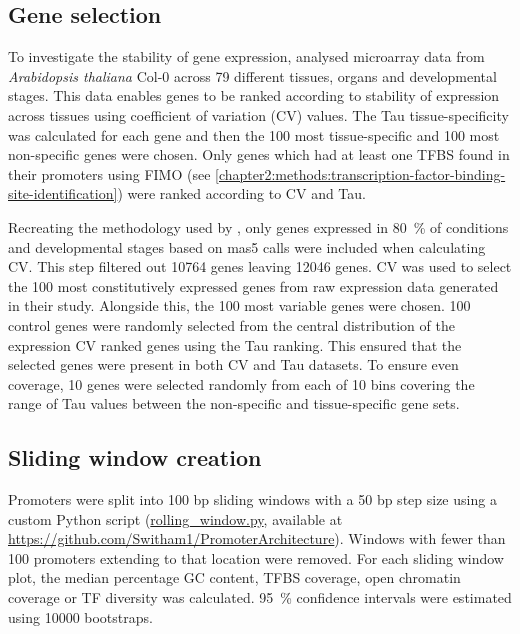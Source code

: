 \documentclass[../main.tex]{subfiles}
\begin{document}
\subsection{Gene selection}\label{chapter2:methods:gene-selection}

To investigate the stability of gene expression, \textcite*{czechowskiGenomeWideIdentificationTesting2005} analysed microarray data from \textit{Arabidopsis thaliana} Col-0 across 79 different tissues, organs and developmental stages.
This data enables genes to be ranked according to stability of expression across tissues using coefficient of variation (CV) values.
The Tau tissue\hyp{}specificity \autocite{yanaiGenomewideMidrangeTranscription2005} was calculated for each gene and then the 100 most tissue\hyp{}specific and 100 most non\hyp{}specific genes were chosen.
Only genes which had at least one TFBS found in their promoters using FIMO (see \autoref{chapter2:methods:transcription-factor-binding-site-identification}) were ranked according to CV and Tau.

Recreating the methodology used by \textcite*{czechowskiGenomeWideIdentificationTesting2005}, only genes expressed in \SI{80}{\percent} of conditions and developmental stages based on mas5 calls were included when calculating CV.
This step filtered out 10764 genes leaving 12046 genes.
CV was used to select the 100 most constitutively expressed genes from raw expression data generated in their study.
Alongside this, the 100 most variable genes were chosen.
100 control genes were randomly selected from the central distribution of the expression CV ranked genes using the Tau ranking.
This ensured that the selected genes were present in both CV and Tau datasets.
To ensure even coverage, 10 genes were selected randomly from each of 10 bins covering the range of Tau values between the non\hyp{}specific and tissue\hyp{}specific gene sets.


\subsection{Sliding window creation}\label{chapter2:methods:sliding-window-creation}

Promoters were split into 100 bp sliding windows with a 50 bp step size using a custom Python script (\href{https://github.com/Switham1/PromoterArchitecture/blob/master/src/rolling_window/rolling_window.py}{rolling\_window.py}, available at \url{https://github.com/Switham1/PromoterArchitecture}).
Windows with fewer than 100 promoters extending to that location were removed.
For each sliding window plot, the median percentage GC content, TFBS coverage, open chromatin coverage or TF diversity was calculated. \SI{95}{\percent} confidence intervals were estimated using 10000 bootstraps.
\end{document}
